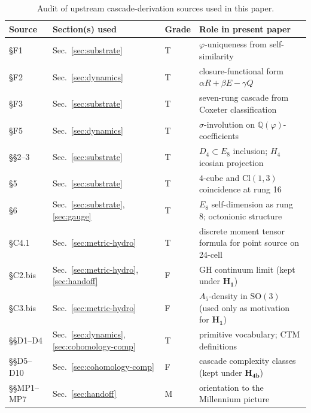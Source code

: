 \documentclass[11pt, a4paper]{amsart}
\theoremstyle{definition}
\newcommand{\Q}{\mathbb{Q}}
\newcommand{\pphi}{\varphi}
\begin{document}
\begin{table}[h]
\caption{Audit of upstream cascade-derivation sources used in this
paper.}
\label{tab:audit}
\begin{tabular}{llll}
\hline
Source & Section(s) used & Grade & Role in present paper \\
\hline
\cite{CascadeFoundations} \S F1 & Sec.~\ref{sec:substrate} & T &
  $\pphi$-uniqueness from self-similarity \\
\cite{CascadeFoundations} \S F2 & Sec.~\ref{sec:dynamics} & T &
  closure-functional form $\alpha R + \beta E - \gamma Q$ \\
\cite{CascadeFoundations} \S F3 & Sec.~\ref{sec:substrate} & T &
  seven-rung cascade from Coxeter classification \\
\cite{CascadeFoundations} \S F5 & Sec.~\ref{sec:dynamics} & T &
  $\sigma$-involution on $\Q(\pphi)$-coefficients \\
\cite{CascadeEmbeddings} \S\S 2--3 & Sec.~\ref{sec:substrate} & T &
  $D_4 \subset E_8$ inclusion; $H_4$ icosian projection \\
\cite{CascadeEmbeddings} \S 5 & Sec.~\ref{sec:substrate} & T &
  $4$-cube and $\mathrm{Cl}(1,3)$ coincidence at rung 16 \\
\cite{CascadeEmbeddings} \S 6 & Sec.~\ref{sec:substrate},
  \ref{sec:gauge} & T & $E_8$ self-dimension as rung 8; octonionic
  structure \\
\cite{CascadeGR} \S C4.1 & Sec.~\ref{sec:metric-hydro} & T &
  discrete moment tensor formula for point source on 24-cell \\
\cite{CascadeGR} \S C2.bis & Sec.~\ref{sec:metric-hydro},
  \ref{sec:handoff} & F & GH continuum limit (kept under $\mathbf{H_1}$) \\
\cite{CascadeGR} \S C3.bis & Sec.~\ref{sec:metric-hydro} & F &
  $A_5$-density in $\mathrm{SO}(3)$ (used only as motivation for
  $\mathbf{H_1}$) \\
\cite{CascadeDynamics} \S\S D1--D4 & Sec.~\ref{sec:dynamics},
  \ref{sec:cohomology-comp} & T & primitive vocabulary; CTM
  definitions \\
\cite{CascadeDynamics} \S\S D5--D10 & Sec.~\ref{sec:cohomology-comp} & F &
  cascade complexity classes (kept under $\mathbf{H_{4b}}$) \\
\cite{CascadeMillennium} \S\S MP1--MP7 & Sec.~\ref{sec:handoff} & M &
  orientation to the Millennium picture \\
\hline
\end{tabular}
\end{table}
\end{document}

